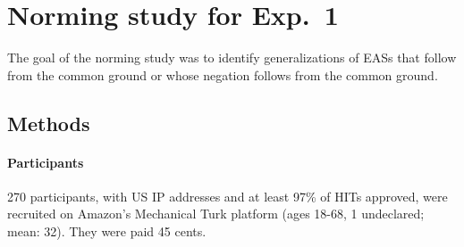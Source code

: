 \documentclass[11pt,fleqn]{article}
\newcommand{\6}{\mbox{$[\hspace*{-.6mm}[$}}
\newcommand{\9}{\mbox{$]\hspace*{-.6mm}]$}}
\begin{document}
%
%
%
%
%
%
%
%
%
%


\section{Norming study for Exp.~1}\label{a-norming}

The goal of the norming study was to identify generalizations of EASs that follow from the common ground or whose negation follows from the common ground. 

\subsection{Methods}

\paragraph{Participants} 270 participants, with US IP addresses and at least 97\% of HITs approved, were recruited on Amazon's Mechanical Turk platform (ages 18-68, 1 undeclared; mean: 32). They were paid 45 cents.
\end{document}
